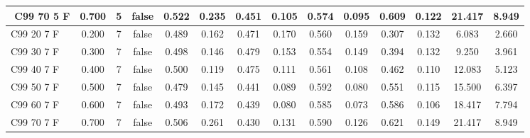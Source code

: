 \documentclass{article}
\begin{document}
\begin{longtable}[c]{|l|c|c|c|c|c|c|c|c|c|c|c|c|c|}
$$ C99 70  5 F & 0.700 & 5 & false & 0.522 & 0.235 & 0.451 & 0.105 & 0.574 & 0.095 & 0.609 & 0.122 & 21.417 & 8.949  \\ \hline 
 C99 20  7 F & 0.200 & 7 & false & 0.489 & 0.162 & 0.471 & 0.170 & 0.560 & 0.159 & 0.307 & 0.132 & 6.083 & 2.660  \\ \hline 
 C99 30  7 F & 0.300 & 7 & false & 0.498 & 0.146 & 0.479 & 0.153 & 0.554 & 0.149 & 0.394 & 0.132 & 9.250 & 3.961  \\ \hline 
 C99 40  7 F & 0.400 & 7 & false & 0.500 & 0.119 & 0.475 & 0.111 & 0.561 & 0.108 & 0.462 & 0.110 & 12.083 & 5.123  \\ \hline 
 C99 50  7 F & 0.500 & 7 & false & 0.479 & 0.145 & 0.441 & 0.089 & 0.592 & 0.080 & 0.551 & 0.115 & 15.500 & 6.397  \\ \hline 
 C99 60  7 F & 0.600 & 7 & false & 0.493 & 0.172 & 0.439 & 0.080 & 0.585 & 0.073 & 0.586 & 0.106 & 18.417 & 7.794  \\ \hline 
 C99 70  7 F & 0.700 & 7 & false & 0.506 & 0.261 & 0.430 & 0.131 & 0.590 & 0.126 & 0.621 & 0.149 & 21.417 & 8.949  \\ \hline 
 \end{longtable} 
\newpage
\end{document}

